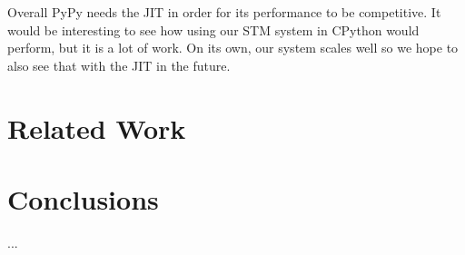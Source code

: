 \documentclass{sigplanconf}
\begin{document}
Overall PyPy needs the JIT in order for its performance to be
competitive.  It would be interesting to see how using our STM system
in CPython would perform, but it is a lot of work. On its own, our
system scales well so we hope to also see that with the JIT in the
future.


\section{Related Work}


\section{Conclusions}




\acks
...




\end{document}
